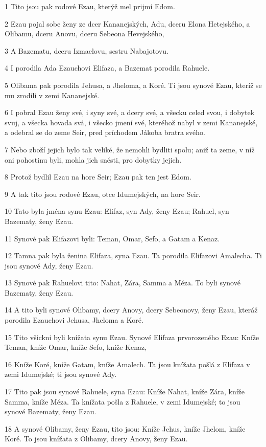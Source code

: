 \par 1 Tito jsou pak rodové Ezau, kterýž mel prijmí Edom.
\par 2 Ezau pojal sobe ženy ze dcer Kananejských, Adu, dceru Elona Hetejského, a Olibamu, dceru Anovu, dceru Sebeona Hevejského,
\par 3 A Bazematu, dceru Izmaelovu, sestru Nabajotovu.
\par 4 I porodila Ada Ezauchovi Elifaza, a Bazemat porodila Rahuele.
\par 5 Olibama pak porodila Jehusa, a Jheloma, a Koré. Ti jsou synové Ezau, kteríž se mu zrodili v zemi Kananejské.
\par 6 I pobral Ezau ženy své, i syny své, a dcery své, a všecku celed svou, i dobytek svuj, a všecka hovada svá, i všecko jmení své, kteréhož nabyl v zemi Kananejské, a odebral se do zeme Seir, pred príchodem Jákoba bratra svého.
\par 7 Nebo zboží jejich bylo tak veliké, že nemohli bydliti spolu; aniž ta zeme, v níž oni pohostinu byli, mohla jich snésti, pro dobytky jejich.
\par 8 Protož bydlil Ezau na hore Seir; Ezau pak ten jest Edom.
\par 9 A tak tito jsou rodové Ezau, otce Idumejských, na hore Seir.
\par 10 Tato byla jména synu Ezau: Elifaz, syn Ady, ženy Ezau; Rahuel, syn Bazematy, ženy Ezau.
\par 11 Synové pak Elifazovi byli: Teman, Omar, Sefo, a Gatam a Kenaz.
\par 12 Tamna pak byla ženina Elifaza, syna Ezau. Ta porodila Elifazovi Amalecha. Ti jsou synové Ady, ženy Ezau.
\par 13 Synové pak Rahuelovi tito: Nahat, Zára, Samma a Méza. To byli synové Bazematy, ženy Ezau.
\par 14 A tito byli synové Olibamy, dcery Anovy, dcery Sebeonovy, ženy Ezau, kteráž porodila Ezauchovi Jehusa, Jheloma a Koré.
\par 15 Tito všickni byli knížata synu Ezau. Synové Elifaza prvorozeného Ezau: Kníže Teman, kníže Omar, kníže Sefo, kníže Kenaz,
\par 16 Kníže Koré, kníže Gatam, kníže Amalech. Ta jsou knížata pošlá z Elifaza v zemi Idumejské; ti jsou synové Ady.
\par 17 Tito pak jsou synové Rahuele, syna Ezau: Kníže Nahat, kníže Zára, kníže Samma, kníže Méza. Ta knížata pošla z Rahuele, v zemi Idumejské; to jsou synové Bazematy, ženy Ezau.
\par 18 A synové Olibamy, ženy Ezau, tito jsou: Kníže Jehus, kníže Jhelom, kníže Koré. To jsou knížata z Olibamy, dcery Anovy, ženy Ezau.
